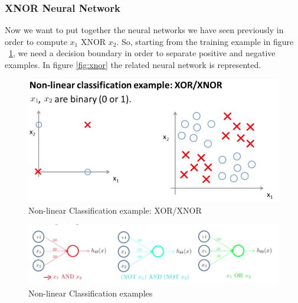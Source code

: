 \subsubsection{ XNOR  Neural Network}
Now we want to put together the neural networks we have seen previously in order to compute $x_1$ XNOR $x_2$. So, starting from the training example in figure ~\ref{fig:xor1-xnor}, we need a decision boundary in order to separate positive and negative examples. In figure \ref{fig:xnor} the related neural network is represented.


\begin{figure}[H]
\begin{center}
\includegraphics[scale=0.25]{images/xor}
\end{center}
\caption{Non-linear Classification example: XOR/XNOR } 
\label{fig:xor1-xnor}
\end{figure}


\begin{figure}[H]
\begin{center}
\includegraphics[scale=0.35]{images/all-logic}
\end{center}
\caption{Non-linear Classification examples } 
\label{xor1}
\end{figure}



